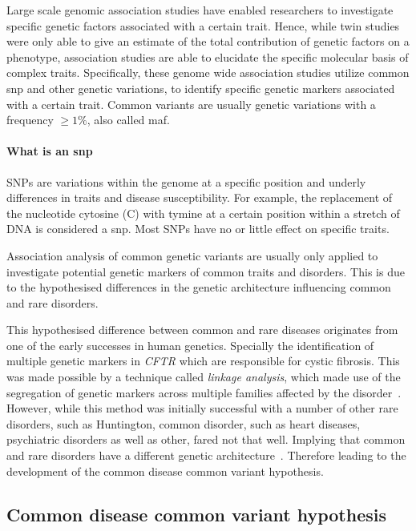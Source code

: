 Large scale genomic association studies have enabled researchers to investigate specific genetic factors associated with a certain trait.
Hence, while twin studies were only able to give an estimate of the total contribution of genetic factors on a phenotype, association studies are able to elucidate the specific molecular basis of complex traits.
Specifically, these genome wide association studies utilize common \acrfull{snp} and other genetic variations, to identify specific genetic markers associated with a certain trait.
Common variants are usually genetic variations with a frequency $\ge 1\%$, also called \acrfull{maf}.

\paragraph{What is an \acrfull{snp}}
\label{par:what_are_snp}
SNPs are variations within the genome at a specific position and underly differences in traits and disease susceptibility. 
For example, the replacement of the nucleotide cytosine (C) with tymine at a certain position within a stretch of DNA is considered a \acrfull{snp}.
Most SNPs have no or little effect on specific traits.

Association analysis of common genetic variants are usually only applied to investigate potential genetic markers of common traits and disorders.
This is due to the hypothesised differences in the genetic architecture influencing common and rare disorders.

This hypothesised difference between common and rare diseases originates from one of the early successes in human genetics.
Specially the identification of multiple genetic markers in \textit{CFTR} which are responsible for cystic fibrosis.
This was made possible by a technique called \textit{linkage analysis}, which made use of the segregation of genetic markers across multiple families affected by the disorder~\cite{Kerem1989}.
However, while this method was initially successful with a number of other rare disorders, such as Huntington, common disorder, such as heart diseases, psychiatric disorders as well as other, fared not that well.  
Implying that common and rare disorders have a different genetic architecture~\cite{Hirschhorn2005a}.
Therefore leading to the development of the common disease common variant hypothesis.

\subsection{Common disease common variant hypothesis}
\label{sub:common_versus_rare_genetic_variants}

